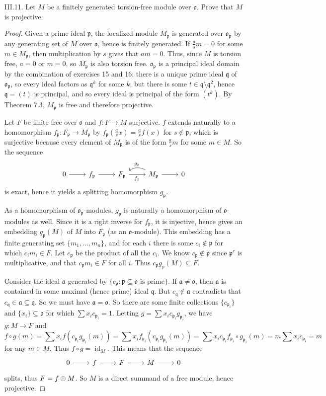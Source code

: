 \documentclass[10pt]{article}
\newcommand{\p}{\mathfrak{p}}
\newcommand{\q}{\mathfrak{q}}
\renewcommand{\a}{\mathfrak{a}}
\renewcommand{\o}{\mathfrak{o}}
\let\ker\relax
\DeclareMathOperator*{\ker}{Ker}
\DeclareMathOperator*{\id}{id}
\begin{document}
\begin{enumerate}
\item[III.11.] Let $M$ be a finitely generated torsion-free module over $\o$.  Prove that $M$ is projective.

\begin{proof}

Given a prime ideal $\p$, the localized module $M_\p$ is generated over $\o_\p$ by any generating set of $M$ over $\o$, hence is finitely generated.  If $\frac{a}{s}m = 0$ for some $m \in M_\p$, then multiplication by $s$ gives that $am = 0$.  Thus, since $M$ is torsion free, $a=0$ or $m=0$, so $M_\p$ is also torsion free.  $\o_\p$ is a principal ideal domain by the combination of exercises 15 and 16: there is a unique prime ideal $\q$ of $\o_\p$, so every ideal factors as $\q^k$ for some $k$; but there is some $t \in \q \setminus \q^2$, hence $\q = (t)$ is principal, and so every ideal is principal of the form $(t^k)$.  By Theorem 7.3, $M_\p$ is free and therefore projective.

Let $F$ be finite free over $\o$ and $f:F \rightarrow M$ surjective.  $f$ extends naturally to a homomorphism $f_\p:F_\p \rightarrow M_\p$ by $f_\p(\frac{a}{s}x) = \frac{a}{s}f(x)$ for $s \not \in \p$, which is surjective because every element of $M_\p$ is of the form $\frac{a}{s}m$ for some $m \in M$.  So the sequence
$$
\begin{tikzcd}
0 \arrow[r]& \ker f_\p \arrow[r] & F_\p \arrow[r, "f_\p"'] & M_\p \arrow[r] \arrow[l, bend right, "g_\p"'] & 0
\end{tikzcd}
$$
is exact, hence it yields a splitting homomorphism $g_\p$.

As a homomorphism of $\o_\p$-modules, $g_\p$ is naturally a homomorphism of $\o$-modules as well.  Since it is a right inverse for $f_\p$, it is injective, hence gives an embedding $g_\p(M)$ of $M$ into $F_\p$ (as an $\o$-module).  This embedding has a finite generating set $\{m_1, \dots , m_n\}$, and for each $i$ there is some $c_i \not \in \p$ for which $c_i m_i \in F$.  Let $c_\p$ be the product of all the $c_i$.  We know $c_\p \not \in \p$ since $\p^c$ is multiplicative, and that $c_\p m_i \in F$ for all $i$.  Thus $c_\p g_p(M) \subseteq F$.

Consider the ideal $\a$ generated by $\{c_\p : \p \subseteq \o \text{ is prime}\}$.  If $\a \neq \o$, then $\a$ is contained in some maximal (hence prime) ideal $\q$.  But $c_\q \not \in \a$ contradicts that $c_\q \in \a \subseteq \q$.  So we must have $\a = \o$.  So there are some finite collections $\{c_{\p_i}\}$ and $\{x_i\} \subseteq \o$ for which $\sum x_i c_{\p_i} = 1$.  Letting $g = \sum x_i c_{\p_i} g_{\p_i}$, we have $g: M \rightarrow F$ and
$$
f \circ g(m) = \sum x_i f (c_{\p_i} g_{\p_i}(m)) = \sum x_i f_{\p_i} (c_{\p_i} g_{\p_i}(m)) = \sum x_i c_{\p_i} f_{\p_i} \circ g_{\p_i}(m) = m\sum x_i c_{\p_i} = m
$$
for any $m \in M$.  Thus $f \circ g = \id_M$.  This means that the sequence
$$
\begin{tikzcd}
0 \arrow[r] & \ker f \arrow[r] & F \arrow[r] & M \arrow[r] & 0
\end{tikzcd}
$$
splits, thus $F = \ker f \oplus M$.  So $M$ is a direct summand of a free module, hence projective.
\end{proof}


\end{enumerate}
\end{document}
